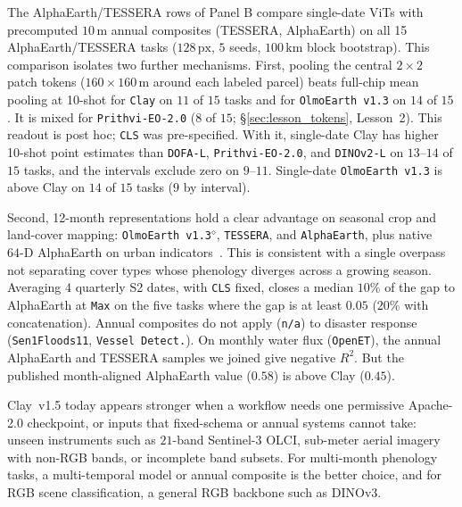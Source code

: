 The AlphaEarth/TESSERA rows of Panel B compare single-date ViTs with precomputed $10\,\text{m}$ annual composites (TESSERA, AlphaEarth) on all 15 AlphaEarth/TESSERA tasks ($128\,\text{px}$, $5$ seeds, $100\,\text{km}$ block bootstrap). This comparison isolates two further mechanisms. First, pooling the central $2\times 2$ patch tokens ($160\times 160\,\text{m}$ around each labeled parcel) beats full-chip mean pooling at 10-shot for \texttt{Clay} on $11$ of $15$ tasks and for \texttt{OlmoEarth~v1.3} on $14$ of $15$. It is mixed for \texttt{Prithvi-EO-2.0} ($8$ of $15$; \S\ref{sec:lesson_tokens}, Lesson~2). This readout is post hoc; \texttt{CLS} was pre-specified. With it, single-date Clay has higher 10-shot point estimates than \texttt{DOFA-L}, \texttt{Prithvi-EO-2.0}, and \texttt{DINOv2-L} on $13\text{--}14$ of $15$ tasks, and the intervals exclude zero on $9\text{--}11$. Single-date \texttt{OlmoEarth~v1.3} is above Clay on $14$ of $15$ tasks ($9$ by interval).

Second, 12-month representations hold a clear advantage on seasonal crop and land-cover mapping: \texttt{OlmoEarth~v1.3}$^\diamond$, \texttt{TESSERA}, and \texttt{AlphaEarth}, plus native $64\text{-D}$ AlphaEarth on urban indicators~\cite{gong2026urban}. This is consistent with a single overpass not separating cover types whose phenology diverges across a growing season. Averaging $4$ quarterly S2 dates, with \texttt{CLS} fixed, closes a median $10\%$ of the gap to AlphaEarth at \texttt{Max} on the five tasks where the gap is at least $0.05$ ($20\%$ with concatenation). Annual composites do not apply (\texttt{n/a}) to disaster response (\texttt{Sen1Floods11}, \texttt{Vessel Detect.}). On monthly water flux (\texttt{OpenET}), the annual AlphaEarth and TESSERA samples we joined give negative $R^2$. But the published month-aligned AlphaEarth value ($0.58$) is above Clay ($0.45$).

Clay~v1.5 today appears stronger when a workflow needs one permissive Apache-2.0 checkpoint, or inputs that fixed-schema or annual systems cannot take: unseen instruments such as $21$-band Sentinel-3 OLCI, sub-meter aerial imagery with non-RGB bands, or incomplete band subsets. For multi-month phenology tasks, a multi-temporal model or annual composite is the better choice, and for RGB scene classification, a general RGB backbone such as DINOv3.
